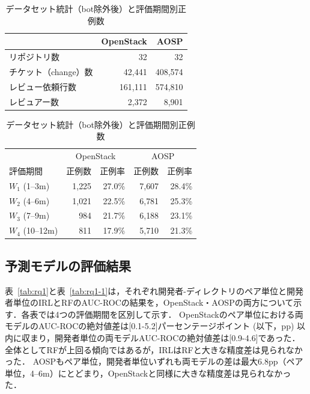 \documentclass[submit,noauthor,ses,dvipdfmx]{ipsj}
\newcommand{\todo}[1]{\colorbox{yellow}{{\bf TODO}:}{\color{red} {\textbf{[#1]}}}}
\begin{document}
\begin{table}[t]
\caption{ データセット統計（bot除外後）と評価期間別正例数}
\label{tab:dataset}
\centering
\footnotesize
\begin{tabular}{lrr}
\hline
 & OpenStack & AOSP \\
\hline
リポジトリ数 & 32 & 32 \\
チケット（change）数 & 42{,}441 & 408{,}574 \\
レビュー依頼行数 & 161{,}111 & 574{,}810 \\
レビュアー数 & 2{,}372 & 8{,}901 \\
\hline
\end{tabular}
\hspace{2mm}
\begin{tabular}{lrrrr}
\hline
 & \multicolumn{2}{c}{OpenStack} & \multicolumn{2}{c}{AOSP} \\
評価期間 & 正例数 & 正例率 & 正例数 & 正例率 \\
\hline
$W_1$ (1--3m) & 1{,}225 & 27.0\% & 7{,}607 & 28.4\% \\
$W_2$ (4--6m) & 1{,}021 & 22.5\% & 6{,}781 & 25.3\% \\
$W_3$ (7--9m) & 984 & 21.7\% & 6{,}188 & 23.1\% \\
$W_4$ (10--12m) & 811 & 17.9\% & 5{,}710 & 21.3\% \\
\hline
\end{tabular}
\end{table}


\vspace{-4mm}
\subsection{予測モデルの評価結果}

表~\ref{tab:rq1}と表~\ref{tab:rq1-1}は，それぞれ開発者-ディレクトリのペア単位と開発者単位のIRLとRFのAUC-ROCの結果を，OpenStack・AOSPの両方について示す．各表では4つの評価期間を区別して示す．
OpenStackのペア単位における両モデルのAUC-ROCの絶対値差は[0.1-5.2]パーセンテージポイント (以下，pp) 以内に収まり，開発者単位の両モデルAUC-ROCの絶対値差は[0.9-4.6]であった．全体としてRFが上回る傾向ではあるが，IRLはRFと大きな精度差は見られなかった．
\noindent AOSPもペア単位，開発者単位いずれも両モデルの差は最大$6.8$pp（ペア単位，4--6m）にとどまり，OpenStackと同様に大きな精度差は見られなかった．


\end{document}
